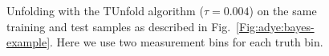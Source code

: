 \documentclass{cernrep}
\begin{document}
\begin{figure}
%
\caption{Unfolding with the TUnfold algorithm ($\tau=0.004$) on
the same training and test samples as described in Fig.~\ref{Fig:adye:bayes-example}.
Here we use two measurement bins for each truth bin.
}\label{Fig:adye:tunfold-example}
\end{figure}
\end{document}
